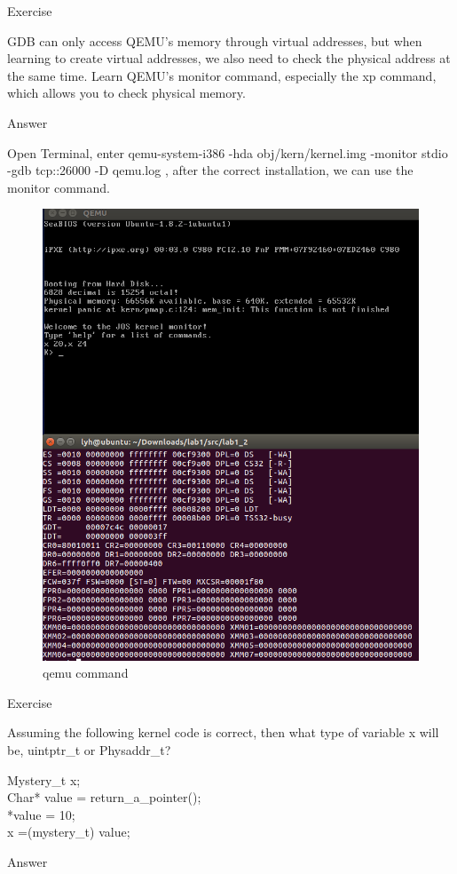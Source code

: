 \begin{flushleft}
{\Large Exercise}
\end{flushleft}

GDB can only access QEMU's memory through virtual addresses, but when learning to create virtual addresses, we also need to check the physical address at the same time. Learn QEMU's monitor command, especially the xp command, which allows you to check physical memory.

\begin{flushleft}
{\Large Answer}
\end{flushleft}

Open Terminal, enter qemu-system-i386 -hda obj/kern/kernel.img -monitor stdio -gdb tcp::26000 -D qemu.log , after the correct installation, we can use the monitor command.
\begin{figure}[H]
\centering
\includegraphics[width=0.8\linewidth]{figure/qemu_commond}
\caption{qemu command}
\end{figure}

\begin{flushleft}
{\Large Exercise}
\end{flushleft}

Assuming the following kernel code is correct, then what type of variable x will be, uintptr\_t or
Physaddr\_t?
\begin{flushleft}
Mystery\_t x;\\
Char* value = return\_a\_pointer();\\
*value = 10; \\
x =(mystery\_t) value;\\
\end{flushleft}
\begin{flushleft}
{\Large Answer}
\end{flushleft}

